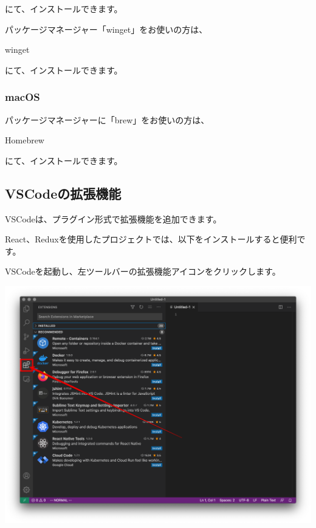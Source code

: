 にて、インストールできます。

パッケージマネージャー「winget」をお使いの方は、\\[0pt]

\def\startercodeblockfontsize{}
\begin{starterterminal}[]{winget}\end{starterterminal}

にて、インストールできます。

\subsubsection*{macOS}
\keeplastskip{
  \label{sec:1-2-1-2}
  \par\nobreak
}

パッケージマネージャーに「brew」をお使いの方は、\\[0pt]

\def\startercodeblockfontsize{}
\begin{starterterminal}[]{Homebrew}\end{starterterminal}

にて、インストールできます。

\subsection{VSCodeの拡張機能}
\keeplastskip{
  \label{sec:1-2-2}
  \par\nobreak
}

VSCodeは、プラグイン形式で拡張機能を追加できます。

React、Reduxを使用したプロジェクトでは、以下をインストールすると便利です。

VSCodeを起動し、左ツールバーの拡張機能アイコンをクリックします。

\begin{reviewimage}[H]%
\includegraphics[width=1.0\maxwidth]{./images/01-createDevEnv/01_03vscodeExtension.png}%
\label{image:01-createDevEnv:01_03vscodeExtension}
\end{reviewimage}

